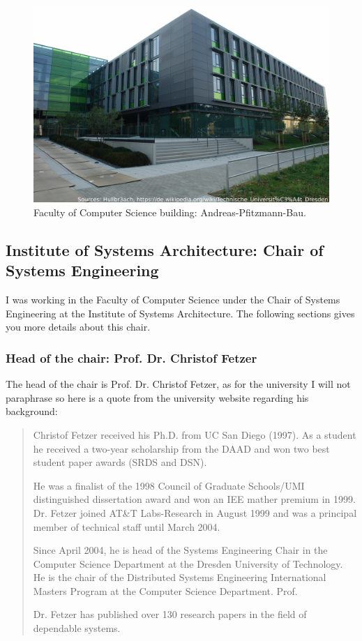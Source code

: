 \documentclass[a4paper,11pt]{report}
\begin{document}
\begin{figure}[ht]
\begin{center}
\includegraphics[width=1\linewidth]{images/informatik_bau.jpg}
\caption{Faculty of Computer Science building: Andreas-Pfitzmann-Bau.}
\label{informatik_bau}
\end{center}
\end{figure}

\subsection{Institute of Systems Architecture: Chair of Systems Engineering}

I was working in the Faculty of Computer Science under the Chair of Systems Engineering at the Institute of Systems Architecture. The following sections gives you more details about this chair.

\subsubsection{Head of the chair: Prof. Dr. Christof Fetzer}

The head of the chair is Prof. Dr. Christof Fetzer, as for the university I will not paraphrase so here is a quote from the university website \cite{tud:chair:head} regarding his background:

\blockquote{Christof Fetzer received his Ph.D. from UC San Diego (1997). 
As a student he received a two-year scholarship from the DAAD and won two best student paper awards (SRDS and DSN). 

He was a finalist of the 1998 Council of Graduate Schools/UMI distinguished dissertation award and won an IEE mather premium in 1999. Dr. Fetzer joined AT\&T Labs-Research in August 1999 and was a principal member of technical staff until March 2004. 

Since April 2004, he is head of the Systems Engineering Chair in the Computer Science Department at the Dresden University of Technology. He is the chair of the Distributed Systems Engineering International Masters Program at the Computer Science Department. Prof. 

Dr. Fetzer has published over 130 research papers in the field of dependable systems.}
 
\end{document}

